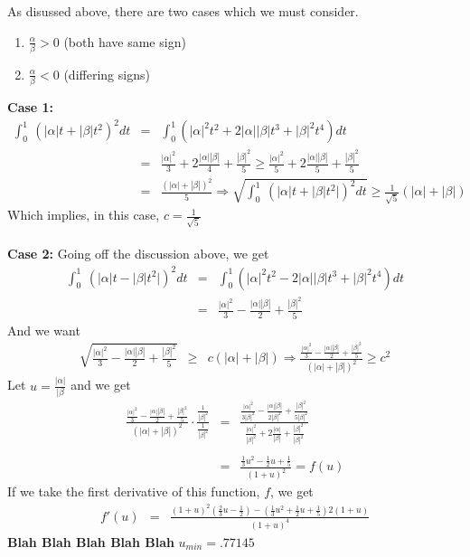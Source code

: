 \documentclass[11pt]{SelfArxOneColBMN}
\begin{document}
\begin{solution}
  \noindent As disussed above, there are two cases which we must consider.
  \begin{enumerate}
    \item $\frac{\alpha}{\beta} > 0$ (both have same sign)
    \item $\frac{\alpha}{\beta} < 0$ (differing signs)
  \end{enumerate}
  \textbf{Case 1:}\\
  \begin{eqnarray*}
    \int_0^1 \: ( |\alpha| t + |\beta| t^2)^2 dt
    &=&
    \int_0^1 ( |\alpha|^2 t^2 + 2 |\alpha| |\beta| t^3 + |\beta|^2 t^4 ) dt\\
    &=&
    \frac{|\alpha|^2}{3} + 2\frac{|\alpha| |\beta|}{4} + \frac{|\beta|^2}{5}
    \geq
    \frac{|\alpha|^2}{5} + 2\frac{|\alpha| |\beta|}{5} + \frac{|\beta|^2}{5}\\
    &=&
    \frac{\left( |\alpha| + |\beta| \right)^2}{5}
    \Longrightarrow
    \sqrt{\int_0^1 \: ( |\alpha| t + |\beta| t^2|)^2 dt}
    \geq \frac{1}{\sqrt{5}} ( |\alpha| + |\beta|)
  \end{eqnarray*}
  Which implies, in this case, $c = \frac{1}{\sqrt{5}}$\\
  \\
  \textbf{Case 2: }
  Going off the discussion above, we get
  \begin{eqnarray*}
    \int_0^1 \: ( |\alpha| t - |\beta| t^2|)^2 dt 
    &=&
    \int_0^1 ( |\alpha|^2 t^2 - 2 |\alpha| |\beta| t^3 + |\beta|^2 t^4 ) dt\\
    &=&
    \frac{|\alpha|^2}{3} - \frac{|\alpha| |\beta|}{2 } + \frac{|\beta|^2}{5}
  \end{eqnarray*}
  And we want\\
  \begin{eqnarray*}
  \sqrt{\frac{|\alpha|^2}{3} - \frac{|\alpha| |\beta|}{2 } + \frac{|\beta|^2}{5}}
  &\geq& c (|\alpha| + |\beta|)
  \Longrightarrow
  \frac{\frac{|\alpha|^2}{3} - \frac{|\alpha| |\beta|}{2 } + \frac{|\beta|^2}{5}}{(|\alpha| + |\beta|)^2}
  \geq c^2
  \end{eqnarray*}
  Let $u = \frac{|\alpha|}{|\beta}$ and we get 
  \begin{eqnarray*}
  \frac{\frac{|\alpha|^2}{3} - \frac{|\alpha| |\beta|}{2 } + \frac{|\beta|^2}{5}}{(|\alpha| + |\beta|)^2} \cdot \frac{\frac{1}{|\beta|^2}}{\frac{1}{|\beta|^2}}
  &=&
  \frac{\frac{|\alpha|^2}{3|\beta|^2} - \frac{|\alpha||\beta|}{2|\beta|^2} + \frac{|\beta|^2}{5|\beta|^2}}{\frac{|\alpha|^2}{|\beta|^2} + 2\frac{|\alpha|}{|\beta|} + \frac{|\beta|^2}{|\beta|^2}}\\
  \\
  &=& \frac{\frac{1}{3}u^2 - \frac{1}{2}u + \frac{1}{5}}{(1+u)^2} = f(u)
  \end{eqnarray*}
  If we take the first derivative of this function, $f$, we get
  \begin{eqnarray*}
    f'(u) &=& \frac{(1 + u)^2(\frac{2}{3}u - \frac{1}{2}) - (\frac{1}{3}u^2 +\frac{1}{2}u + \frac{1}{5})2(1 + u)}{(1 + u)^4}
  \end{eqnarray*}
  \textbf{Blah Blah Blah Blah Blah} $u_{min} = .77145$
\end{solution}
\end{document}
